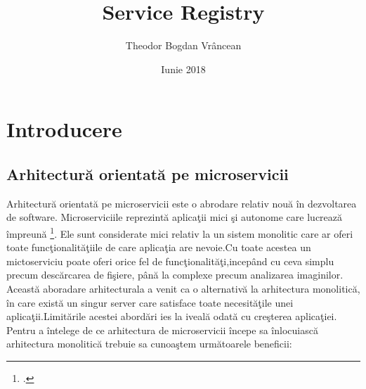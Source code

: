 \documentclass[a4paper,12pt]{report}
\title{Service Registry}
\author{Theodor Bogdan Vr\^ancean}
\date {Iunie 2018}
\begin{document}
\maketitle
\tableofcontents
\chapter{Introducere}


\section{Arhitectur\u a orientat\u a pe microservicii}

Arhitectur\u a orientat\u a pe microservicii este o abrodare relativ nou\u a \^ in dezvoltarea de software.
Microserviciile reprezint\u a aplica\c tii mici \c si autonome care lucreaz\u a \^ impreun\u a
\footcite{buildingMicroservices1}. Ele sunt considerate mici relativ la un sistem monolitic care ar
oferi toate func\c tionalit\u a\c tiile de care aplica\c tia are nevoie.Cu toate acestea un mictoserviciu poate oferi orice
fel de func\c tionalit\u a\c ti,incep\^and cu ceva simplu precum desc\u arcarea de fi\c siere, p\^an\u a la
complexe precum analizarea imaginilor.
Aceast\u a aboradare arhitecturala a venit ca o alternativ\u a la arhitectura monolitic\u a, \^in care exist\u a
un singur server care satisface toate necesit\u a\c tile unei aplica\c tii.Limit\u arile acestei abord\u ari ies la iveal\u a
odat\u a cu cre\c sterea aplica\c tiei.
Pentru a \^intelege de ce arhitectura  de microservicii \^incepe sa \^inlocuiasc\u a arhitectura monolitic\u a
trebuie sa cunoa\c stem urm\u atoarele beneficii:
\end{document}
